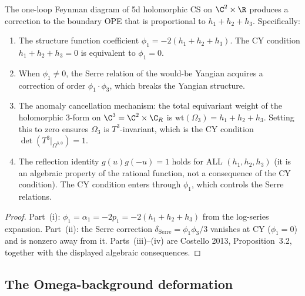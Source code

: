 \begin{proposition}
\label{prop:one-loop-cy-constraint}
The one-loop Feynman diagram of 5d holomorphic CS on $\C^2 \times \R$ produces a correction to the boundary OPE that is proportional to $h_1 + h_2 + h_3$. Specifically:
\begin{enumerate}[label=\textup{(\roman*)}]
 \item The structure function coefficient $\phi_1 = -2(h_1 + h_2 + h_3)$. The CY condition $h_1 + h_2 + h_3 = 0$ is equivalent to $\phi_1 = 0$.
 \item When $\phi_1 \neq 0$, the Serre relation of the would-be Yangian acquires a correction of order $\phi_1 \cdot \phi_3$, which breaks the Yangian structure.
 \item The anomaly cancellation mechanism: the total equivariant weight of the holomorphic $3$-form on $\C^3 = \C^2 \times \C_R$ is $\mathrm{wt}(\Omega_3) = h_1 + h_2 + h_3$. Setting this to zero ensures $\Omega_3$ is $T^3$-invariant, which is the CY condition $\det(T^3|_{\Omega^{3,0}}) = 1$.
 \item The reflection identity $g(u) g(-u) = 1$ holds for ALL $(h_1,h_2,h_3)$ (it is an algebraic property of the rational function, not a consequence of the CY condition). The CY condition enters through $\phi_1$, which controls the Serre relations.
\end{enumerate}
\end{proposition}

\begin{proof}
Part~(i): \(\phi_1=\alpha_1=-2p_1=-2(h_1+h_2+h_3)\) from the
log-series expansion. Part~(ii): the Serre correction
\(\delta_{\mathrm{Serre}}=\phi_1\phi_3/3\) vanishes at CY
(\(\phi_1=0\)) and is nonzero away from it. Parts~(iii)--(iv) are
Costello 2013, Proposition~3.2, together with the displayed algebraic
consequences.
\end{proof}

\subsection{The Omega-background deformation}
\label{subsec:omega-deformation}

